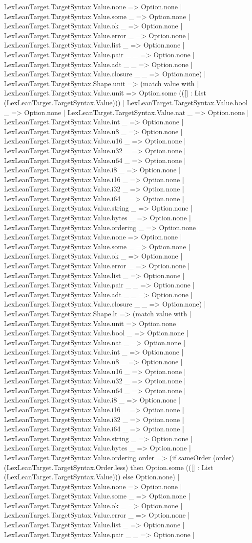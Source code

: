 \documentclass[11pt]{article}
\begin{document}
LexLeanTarget.TargetSyntax.Value.none => Option.none | LexLeanTarget.TargetSyntax.Value.some \_ => Option.none | LexLeanTarget.TargetSyntax.Value.ok \_ => Option.none | LexLeanTarget.TargetSyntax.Value.error \_ => Option.none | LexLeanTarget.TargetSyntax.Value.list \_ => Option.none | LexLeanTarget.TargetSyntax.Value.pair \_ \_ => Option.none | LexLeanTarget.TargetSyntax.Value.adt \_ \_ => Option.none | LexLeanTarget.TargetSyntax.Value.closure \_ \_ => Option.none) | LexLeanTarget.TargetSyntax.Shape.unit => (match value with | LexLeanTarget.TargetSyntax.Value.unit => Option.some (([] : List (LexLeanTarget.TargetSyntax.Value))) | LexLeanTarget.TargetSyntax.Value.bool \_ => Option.none | LexLeanTarget.TargetSyntax.Value.nat \_ => Option.none | LexLeanTarget.TargetSyntax.Value.int \_ => Option.none | LexLeanTarget.TargetSyntax.Value.u8 \_ => Option.none | LexLeanTarget.TargetSyntax.Value.u16 \_ => Option.none | LexLeanTarget.TargetSyntax.Value.u32 \_ => Option.none | LexLeanTarget.TargetSyntax.Value.u64 \_ => Option.none | LexLeanTarget.TargetSyntax.Value.i8 \_ => Option.none | LexLeanTarget.TargetSyntax.Value.i16 \_ => Option.none | LexLeanTarget.TargetSyntax.Value.i32 \_ => Option.none | LexLeanTarget.TargetSyntax.Value.i64 \_ => Option.none | LexLeanTarget.TargetSyntax.Value.string \_ => Option.none | LexLeanTarget.TargetSyntax.Value.bytes \_ => Option.none | LexLeanTarget.TargetSyntax.Value.ordering \_ => Option.none | LexLeanTarget.TargetSyntax.Value.none => Option.none | LexLeanTarget.TargetSyntax.Value.some \_ => Option.none | LexLeanTarget.TargetSyntax.Value.ok \_ => Option.none | LexLeanTarget.TargetSyntax.Value.error \_ => Option.none | LexLeanTarget.TargetSyntax.Value.list \_ => Option.none | LexLeanTarget.TargetSyntax.Value.pair \_ \_ => Option.none | LexLeanTarget.TargetSyntax.Value.adt \_ \_ => Option.none | LexLeanTarget.TargetSyntax.Value.closure \_ \_ => Option.none) | LexLeanTarget.TargetSyntax.Shape.lt => (match value with | LexLeanTarget.TargetSyntax.Value.unit => Option.none | LexLeanTarget.TargetSyntax.Value.bool \_ => Option.none | LexLeanTarget.TargetSyntax.Value.nat \_ => Option.none | LexLeanTarget.TargetSyntax.Value.int \_ => Option.none | LexLeanTarget.TargetSyntax.Value.u8 \_ => Option.none | LexLeanTarget.TargetSyntax.Value.u16 \_ => Option.none | LexLeanTarget.TargetSyntax.Value.u32 \_ => Option.none | LexLeanTarget.TargetSyntax.Value.u64 \_ => Option.none | LexLeanTarget.TargetSyntax.Value.i8 \_ => Option.none | LexLeanTarget.TargetSyntax.Value.i16 \_ => Option.none | LexLeanTarget.TargetSyntax.Value.i32 \_ => Option.none | LexLeanTarget.TargetSyntax.Value.i64 \_ => Option.none | LexLeanTarget.TargetSyntax.Value.string \_ => Option.none | LexLeanTarget.TargetSyntax.Value.bytes \_ => Option.none | LexLeanTarget.TargetSyntax.Value.ordering order => (if sameOrder (order) (LexLeanTarget.TargetSyntax.Order.less) then Option.some (([] : List (LexLeanTarget.TargetSyntax.Value))) else Option.none) | LexLeanTarget.TargetSyntax.Value.none => Option.none | LexLeanTarget.TargetSyntax.Value.some \_ => Option.none | LexLeanTarget.TargetSyntax.Value.ok \_ => Option.none | LexLeanTarget.TargetSyntax.Value.error \_ => Option.none | LexLeanTarget.TargetSyntax.Value.list \_ => Option.none | LexLeanTarget.TargetSyntax.Value.pair \_ \_ => Option.none | 
\end{document}
